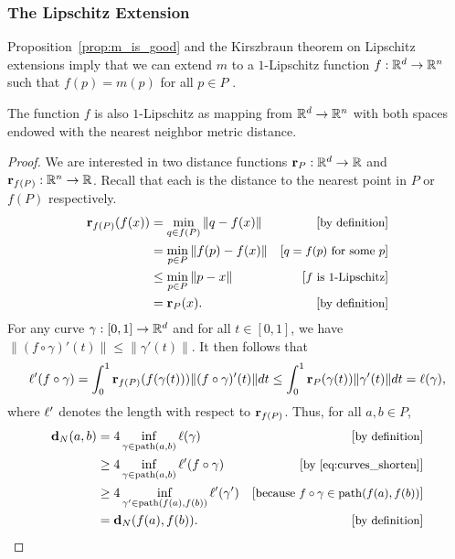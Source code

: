 \subsubsection{The Lipschitz Extension} %
\label{sec:lip_extension}

  Proposition~\ref{prop:m_is_good} and the Kirszbraun theorem on Lipschitz extensions imply that we can extend $m$ to a $1$-Lipschitz function $f: \mathbb{R}^d\to \mathbb{R}^n$ such that $f(p) = m(p)$ for all $p\in P$ \cite{Kirszbraun1934,Valentine1945,brehm1981}.

  \begin{lemma}\label{lem:dist_N_lipschitz}
    The function $f$ is also $1$-Lipschitz as mapping from $\mathbb{R}^d\to \mathbb{R}^n$ with both spaces endowed with the nearest neighbor metric distance.
  \end{lemma}
  \begin{proof}
    We are interested in two distance functions $\mathbf{r}_P:\mathbb{R}^d \to \mathbb{R}$ and $\mathbf{r}_{f(P)}: \mathbb{R}^n\to \mathbb{R}$.
    Recall that each is the distance to the nearest point in $P$ or $f(P)$ respectively.
    \begin{align*}
      \mathbf{r}_{f(P)}(f(x)) 
        &= \min_{q\in f(P)} \|q - f(x)\| &\left[\text{\small{by definition}}\right]\\
        &= \min_{p\in P} \|f(p) - f(x)\| &\left[\text{\small{$q = f(p)$ for some $p$}}\right]\\
        &\le \min_{p\in P} \|p - x\| &\left[\text{\small{$f$ is $1$-Lipschitz}}\right]\\ 
        &= \mathbf{r}_P(x). &\left[\text{\small{by definition}}\right]
    \end{align*}
    For any curve $\gamma:[0,1]\to \mathbb{R}^d$ and for all $t\in [0,1]$, we have $\|(f\circ \gamma)'(t)\| \le \|\gamma'(t)\|$.
    It then follows that
    \begin{equation}\label{eq:curves_shorten}
      \ell'(f\circ \gamma) = \int_0^1 \mathbf{r}_{f(P)}(f(\gamma(t)))\|(f\circ\gamma)'(t)\|dt \le \int_0^1 \mathbf{r}_{P}(\gamma(t))\|\gamma'(t)\|dt = \ell(\gamma),
    \end{equation}
    where $\ell'$ denotes the length with respect to $\mathbf{r}_{f(P)}$.
    Thus, for all $a,b\in P$,
    \begin{align*}
      \mathbf{d}_N(a,b)
        &= 4 \inf_{\gamma\in \mathrm{path}(a,b)} \ell(\gamma) &\left[\text{\small{by definition}}\right]\\
        &\ge 4 \inf_{\gamma\in \mathrm{path}(a,b)} \ell'(f\circ\gamma) &\left[\text{\small{by \eqref{eq:curves_shorten}}}\right]\\
        &\ge 4 \inf_{\gamma'\in \mathrm{path}(f(a),f(b))} \ell'(\gamma') &\left[\text{\small{because $f\circ\gamma\in \mathrm{path}(f(a), f(b))$}}\right]\\
        &= \mathbf{d}_N(f(a), f(b)). &\left[\text{\small{by definition}}\right]
    \end{align*}
  \end{proof}
  
